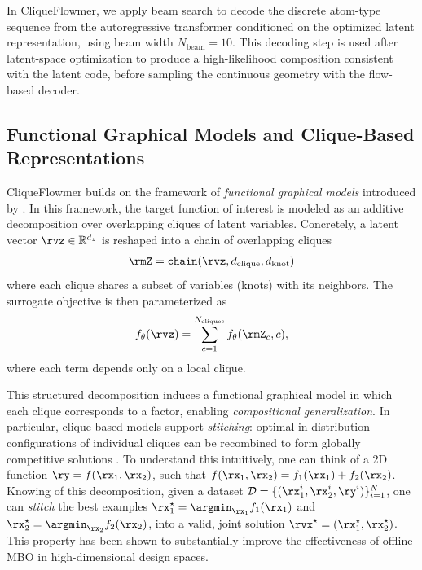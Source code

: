 \documentclass{article}
\theoremstyle{plain}
\theoremstyle{definition}
\theoremstyle{remark}
\begin{document}
In CliqueFlowmer, we apply beam search to decode the discrete atom-type sequence from the autoregressive transformer conditioned on the optimized latent representation, using beam width $N_{\text{beam}}=10$. This decoding step is used after latent-space optimization to produce a high-likelihood composition consistent with the latent code, before sampling the continuous geometry with the flow-based decoder.


\subsection{Functional Graphical Models and Clique-Based Representations}
\label{sec:appendix-fgm}

CliqueFlowmer builds on the framework of \emph{functional graphical models} introduced by \citet{grudzien2024functional}. In this framework, the target function of interest is modeled as an additive decomposition over overlapping cliques of latent variables. Concretely, a latent vector $\rvz \in \mathbb{R}^{d_z}$ is reshaped into a chain of overlapping cliques
\begin{align}
\rmZ = \texttt{chain}(\rvz, d_{\text{clique}}, d_{\text{knot}})\nonumber
\end{align}
where each clique shares a subset of variables (knots) with its neighbors. The surrogate objective is then parameterized as
\begin{align}
f_\theta(\rvz) = \sum_{c=1}^{N_{\text{cliques}}} f_\theta(\rmZ_c, c),\nonumber
\end{align}
where each term depends only on a local clique.

This structured decomposition induces a functional graphical model in which each clique corresponds to a factor, enabling \emph{compositional generalization}. In particular, clique-based models support \emph{stitching}: optimal in-distribution configurations of individual cliques can be recombined to form globally competitive solutions \citep{fu2020d4rl, kuba2024cliqueformer}.
To understand this intuitively, one can think of a 2D function $\ry=f(\rx_1, \rx_2)$, such that $f(\rx_1, \rx_2)=f_1(\rx_1)+f_2(\rx_2)$.
Knowing of this decomposition, given a dataset $\mathcal{D}=\{(\rx_{1}^i, \rx_{2}^i, \ry^i)\}_{i=1}^{N}$, one can \emph{stitch} the best examples $\rx_{1}^{\star}=\argmin_{\rx_1}f_1(\rx_1)$ and $\rx_{2}^{\star}=\argmin_{\rx_2}f_2(\rx_2)$, into a valid, joint solution $\rvx^{\star}=(\rx^{\star}_1, \rx^{\star}_2)$.
This property has been shown to substantially improve the effectiveness of offline MBO in high-dimensional design spaces.
\end{document}
